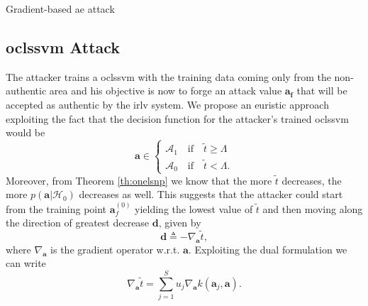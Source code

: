 \documentclass[draftcls,onecolumn,12pt]{IEEEtran}
\newcommand{\wrt}{w.r.t. }
\begin{document}
\begin{algorithm}[t]
\label{alg:rnnGrad}
  \scriptsize

 

    
 \caption{Gradient-based \ac{ae} attack}
\end{algorithm}


\subsection{\Acl{oclssvm} Attack}
The attacker trains a \ac{oclssvm} with the training data coming only from the non-authentic area and his objective is now to forge an attack value $\mathbf{a_{f}}$ that will be accepted as authentic by the \ac{irlv} system. We propose an euristic approach  exploiting the fact that the decision function for the attacker's trained \ac{oclssvm} would be
\begin{equation}
\mathbf{a} \in
	\begin{cases}
		\mathcal{A}_1 \quad \text{if} \quad \tilde{t} \geq \Lambda \\
		\mathcal{A}_0 \quad \text{if} \quad \tilde{t} < \Lambda.
	\end{cases}	
\end{equation} 
Moreover, from Theorem \ref{th:onelsnp} we know that the more $\tilde{t}$ decreases, the more $p(\mathbf{a}|\mathcal{H}_0)$ decreases as well.
This suggests that the attacker could start from the training point $\mathbf{a}_{f}^{(0)}$ yielding the lowest value of $\tilde{t}$ and then moving along the direction of greatest decrease $\mathbf{d}$, given by
\begin{equation}
\label{eq:dDef}
	\mathbf{d} \triangleq - \nabla_{\mathbf{a}} \tilde{t},
\end{equation} 
where $\nabla_{\mathbf{a}}$ is the gradient operator \wrt $\mathbf{a}$. Exploiting the dual formulation \cite{choi2009least} we can write
\begin{equation}
\label{eq:gradient}
		\nabla_{\mathbf{a}} \tilde{t} = \sum_{j=1}^{S} u_j \nabla_{\mathbf{a}} k(\mathbf{a}_j,\mathbf{a}).
\end{equation}
\end{document}
